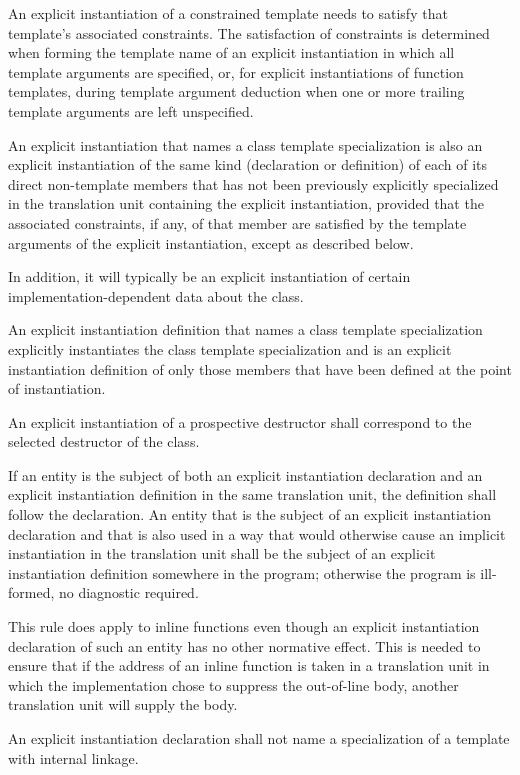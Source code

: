 \pnum
\begin{note}
An explicit instantiation of a constrained template needs
to satisfy that template's associated constraints.
The satisfaction of constraints is determined
when forming the template name of an explicit instantiation
in which all template arguments are specified,
or, for explicit instantiations of function templates,
during template argument deduction
when one or more trailing template arguments are left unspecified.
\end{note}

\pnum
An explicit instantiation that names a class
template specialization is also an explicit
instantiation of the same kind (declaration or definition) of each
of its direct non-template members
that has not been previously explicitly specialized in
the translation unit containing the explicit instantiation,
provided that the associated constraints, if any,
of that member are satisfied by the template arguments of the explicit
instantiation,
except as described below.
\begin{note}
In addition, it will typically be an explicit instantiation of certain
%
implementation-dependent data about the class.
\end{note}

\pnum
An explicit instantiation definition that names a class template
specialization explicitly instantiates the class template specialization
and is an explicit instantiation definition of only those
members that have been defined at the point of instantiation.

\pnum
An explicit instantiation of a prospective destructor
shall correspond to the selected destructor of the class.

\pnum
If an entity is the subject of both an explicit instantiation declaration
and an explicit instantiation definition in the same translation unit, the
definition shall follow the declaration. An entity that is the subject of an
explicit instantiation declaration and that is also used
in a way that would otherwise cause an implicit instantiation
in the translation unit
shall be the subject of an explicit instantiation definition somewhere in the
program; otherwise the program is ill-formed, no diagnostic required.
\begin{note}
This rule does apply to inline functions even though an
explicit instantiation declaration of such an entity has no other normative
effect. This is needed to ensure that if the address of an inline function is
taken in a translation unit in which the implementation chose to suppress the
out-of-line body, another translation unit will supply the body.
\end{note}
An explicit instantiation declaration shall not name a specialization of a
template with internal linkage.

